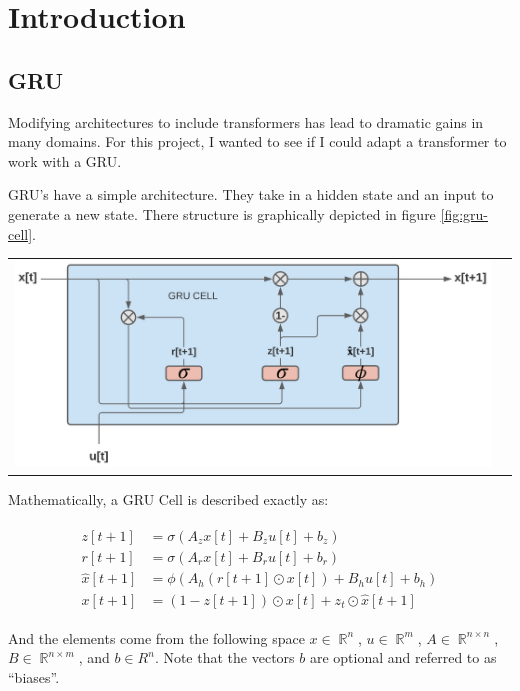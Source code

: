 \documentclass{article}
\DeclareMathOperator{\R}{\mathbb{R}}
\numberwithin{equation}{subsection}
\begin{document}
\section{Introduction}
\subsection{GRU}

Modifying architectures to include transformers has lead to dramatic gains in many domains.
For this project, I wanted to see if I could adapt a transformer to work with a GRU.

GRU's have a simple architecture. They take in a hidden state and an input to generate 
a new state. There structure is graphically depicted in figure \ref{fig:gru-cell}.

\begin{center}
  \begin{tabular}{cc}
    \includegraphics[width=.8\linewidth]{./figures/00-gru-cell}
  \end{tabular}
   \label{fig:gru-cell}
\end{center}

Mathematically, a GRU Cell is described exactly as:

\begin{align}
  \begin{split}
    z[t+1] &= \sigma ( A_z x[t] + B_z u[t] + b_z) \\ 
    r[t+1] &= \sigma ( A_r x[t] + B_r u[t] + b_r) \\
    \hat x[t+1] &= \phi( A_h(r[t+1] \odot x[t]) + B_h u[t] + b_h) \\
    x[t+1] &= (1-z[t+1]) \odot x[t] + z_t \odot \hat x[t+1]
  \end{split} \label{eq:gru-cell}
\end{align}


And the elements come from the following space $x \in \R^n$, $u \in \R^m$,
$A \in \R^{n \times n}$, $B \in \R^{n \times m}$, and $b \in R^n$. Note that the vectors $b$ are optional and referred to as ``biases''.
\end{document}
